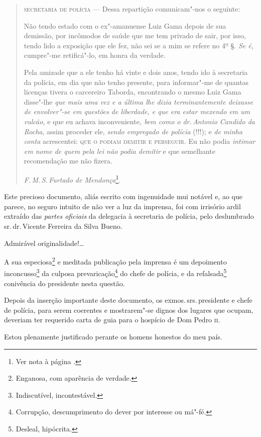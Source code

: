 \begin{quote}
\textsc{secretaria de polícia} --- Dessa repartição comunicam"-nos o seguinte:

Não tendo estado com o ex"-amanuense Luiz Gama depois de sua demissão,
por incômodos de saúde que me tem privado de sair, por isso, tendo lido
a exposição que ele fez, não sei se a mim se refere no 4º §. \emph{Se
é}, cumpre"-me retificá"-lo, em honra da verdade.

Pela amizade que a ele tenho há vinte e dois anos, tendo ido à
secretaria da polícia, em dia que não tenho presente, para informar"-me
de quantas licenças tivera o carcereiro Taborda, encontrando o mesmo
Luiz Gama disse"-lhe \emph{que mais uma vez e a última lhe dizia
terminantemente deixasse de envolver"-se em questões de liberdade, e que
era estar mexendo em um vulcão,} e que eu achava inconveniente\emph{,
bem como o dr.\,Antonio Candido da Rocha}, assim proceder ele,
\emph{sendo empregado de polícia} (!!!); e \emph{de minha conta}
acrescentei: \textsc{que o podiam demitir e perseguir}. Eu não podia
\emph{intimar em nome de quem pela lei não podia demitir} e que
semelhante recomendação me não fizera.

\hfill\emph{F.\,M.\,S.\,Furtado de Mendonça}\footnote{Ver nota à página \pageref{fmfm}.}.
\end{quote}

Este precioso documento, aliás escrito com ingenuidade mui notável e, ao
que parece, no seguro intuito de não ver a luz da imprensa, foi com
irrisório ardil extraído das \emph{partes oficiais} da delegacia à
secretaria de polícia, pelo deslumbrado sr.\,dr.\,Vicente Ferreira da
Silva Bueno.

Admirável originalidade!\ldots{}

A sua especiosa\footnote{Enganosa, com aparência de verdade.} e
meditada publicação pela imprensa é um depoimento inconcusso\footnote{
  Indiscutível, incontestável.} da culposa prevaricação\footnote{
  Corrupção, descumprimento do dever por interesse ou má"-fé.} do chefe
de polícia, e da refalsada\footnote{Desleal, hipócrita.}
conivência do presidente
nesta questão.

Depois da inserção importante deste documento, os exmos.\,srs.\,presidente
e chefe de polícia, para serem coerentes e mostrarem"-se dignos dos
lugares que ocupam, deveriam ter requerido carta de guia para o hospício
de Dom Pedro \textsc{ii}.

Estou plenamente justificado perante os homens honestos do meu país.

